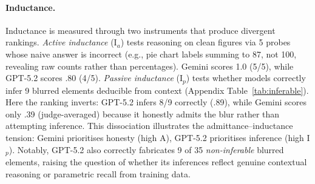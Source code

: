 \paragraph{Inductance.}
Inductance is measured through two instruments that produce divergent rankings.
\emph{Active inductance} (I$_a$) tests reasoning on clean figures via 5 probes whose naive answer is incorrect (e.g., pie chart labels summing to 87, not 100, revealing raw counts rather than percentages).
Gemini scores 1.0 (5/5), while GPT-5.2 scores .80 (4/5).
\emph{Passive inductance} (I$_p$) tests whether models correctly infer 9 blurred elements deducible from context (Appendix Table~\ref{tab:inferable}).
Here the ranking inverts: GPT-5.2 infers 8/9 correctly (.89), while Gemini scores only .39 (judge-averaged) because it honestly admits the blur rather than attempting inference.
This dissociation illustrates the admittance--inductance tension: Gemini prioritises honesty (high A), GPT-5.2 prioritises inference (high I$_p$).
Notably, GPT-5.2 also correctly fabricates 9 of 35 \emph{non-inferable} blurred elements, raising the question of whether its inferences reflect genuine contextual reasoning or parametric recall from training data.


